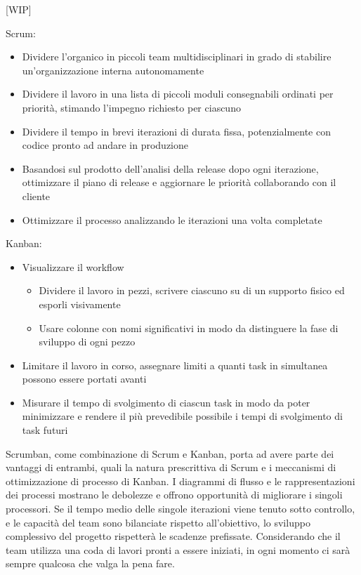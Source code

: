 [WIP]
\begin{multicols}{2}
Scrum:
\begin{itemize}
\item
Dividere l'organico in piccoli team multidisciplinari in grado di stabilire un'organizzazione interna autonomamente
\item
Dividere il lavoro in una lista di piccoli moduli consegnabili ordinati per priorità, stimando l'impegno richiesto per ciascuno
\item
Dividere il tempo in brevi iterazioni di durata fissa, potenzialmente con codice pronto ad andare in produzione
\item
Basandosi sul prodotto dell'analisi della release dopo ogni iterazione, ottimizzare il piano di release e aggiornare le priorità collaborando con il cliente
\item
Ottimizzare il processo analizzando le iterazioni una volta completate
\end{itemize}
\columnbreak
Kanban:
\begin{itemize}
\item
Visualizzare il workflow
\begin{itemize}
\item
Dividere il lavoro in pezzi, scrivere ciascuno su di un supporto fisico ed esporli visivamente
\item
Usare colonne con nomi significativi in modo da distinguere la fase di sviluppo di ogni pezzo
\end{itemize}
\item
Limitare il lavoro in corso, assegnare limiti a quanti task in simultanea possono essere portati avanti
\item
Misurare il tempo di svolgimento di ciascun task in modo da poter minimizzare e rendere il più prevedibile possibile i tempi di svolgimento di task futuri
\end{itemize}
\end{multicols}

Scrumban, come combinazione di Scrum e Kanban, porta ad avere parte dei vantaggi di entrambi, quali la natura prescrittiva di Scrum e i meccanismi di ottimizzazione di processo di Kanban.
I diagrammi di flusso e le rappresentazioni dei processi mostrano le debolezze e offrono opportunità di migliorare i singoli processori.
Se il tempo medio delle singole iterazioni viene tenuto sotto controllo, e le capacità del team sono bilanciate rispetto all'obiettivo, lo sviluppo complessivo del progetto rispetterà le scadenze prefissate.
Considerando che il team utilizza una coda di lavori pronti a essere iniziati, in ogni momento ci sarà sempre qualcosa che valga la pena fare.
\\
